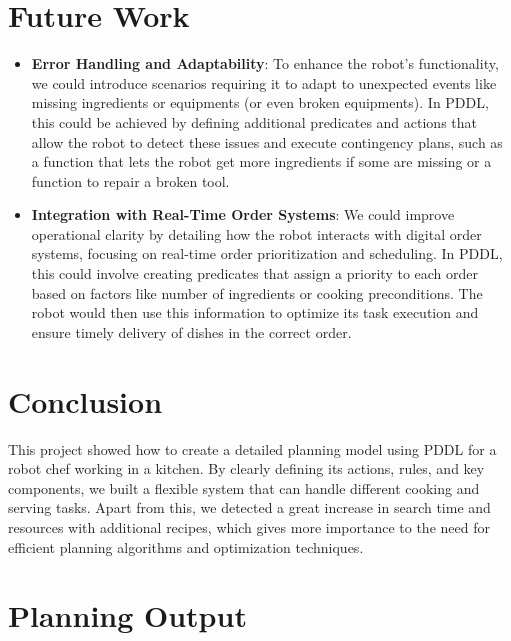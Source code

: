 \documentclass[a4paper,12pt]{article}
\begin{document}
\section{Future Work}
\begin{itemize}
\item \textbf{Error Handling and Adaptability}: To enhance the robot's functionality, we could introduce scenarios requiring it to adapt to unexpected events like missing ingredients or equipments (or even broken equipments). In PDDL, this could be achieved by defining additional predicates and actions that allow the robot to detect these issues and execute contingency plans, such as a function that lets the robot get more ingredients if some are missing or a function to repair a broken tool.

\item \textbf{Integration with Real-Time Order Systems}: We could improve operational clarity by detailing how the robot interacts with digital order systems, focusing on real-time order prioritization and scheduling. In PDDL, this could involve creating predicates that assign a priority to each order based on factors like number of ingredients or cooking preconditions. The robot would then use this information to optimize its task execution and ensure timely delivery of dishes in the correct order.
\end{itemize}


\section{Conclusion}
\label{sec:conclusion}
This project showed how to create a detailed planning model using PDDL for a robot chef working in a kitchen. By clearly defining its actions, rules, and key components, we built a flexible system that can handle different cooking and serving tasks. Apart from this, we detected a great increase in search time and resources with additional recipes, which gives more importance to the need for efficient planning algorithms and optimization techniques. 



\newpage
\appendix
\section{Planning Output}
\end{document}
